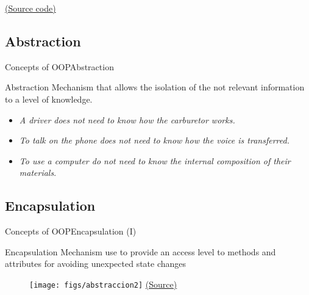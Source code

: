 \documentclass[10pt,compress]{beamer} %
\begin{document}
\begin{frame}[plain]%
	\begin{exampleblock}{}
	\vspace{-0.3cm} 
		
	\end{exampleblock}

	\href{https://gist.github.com/dfbarrero/0b401926b92a5e36ad08a3eae5fbd16c}{(Source code)}
\end{frame}

\subsection{Abstraction}

\begin{frame}{Concepts of OOP}{Abstraction}
	\begin{block}{Abstraction}
		Mechanism that allows the isolation of the not relevant information to a level of knowledge.
  	\end{block}	
	
	\begin{itemize}
		\item \textit{A driver does not need to know how the carburetor works.} 
		\item \textit{To talk on the phone does not need to know how the voice is transferred.} 
		\item \textit{To use a computer do not need to know the internal composition of their materials}. 							  
		
	\end{itemize}
\end{frame}

\subsection{Encapsulation}

\begin{frame}{Concepts of OOP}{Encapsulation (I)}
	\begin{block}{Encapsulation}
		Mechanism use to provide an access level to methods and attributes for avoiding unexpected state changes
  	\end{block}	

	\begin{figure}
		\texttt{[image: figs/abstraccion2]}
		\scriptsize \href{http://www.onlinebuff.com}{(Source)}
	\end{figure}
\end{frame}
\end{document}
